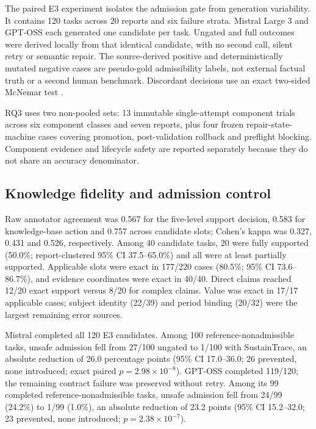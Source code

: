\documentclass[a4paper,fleqn]{cas-sc}
\begin{document}
The paired E3 experiment isolates the admission gate from generation variability. It contains 120
tasks across 20 reports and six failure strata. Mistral Large 3 and GPT-OSS each generated one
candidate per task. Ungated and full outcomes were derived locally from that identical candidate,
with no second call, silent retry or semantic repair. The source-derived positive and
deterministically mutated negative cases are pseudo-gold admissibility labels, not external factual
truth or a second human benchmark. Discordant decisions use an exact two-sided McNemar test
\citep{mcnemar1947sampling}.

RQ3 uses two non-pooled sets: 13 immutable single-attempt component trials across six component
classes and seven reports, plus four frozen repair-state-machine cases covering promotion,
post-validation rollback and preflight blocking. Component evidence and lifecycle safety are
reported separately because they do not share an accuracy denominator.

\subsection{Knowledge fidelity and admission control}

Raw annotator agreement was 0.567 for the five-level support decision, 0.583 for knowledge-base
action and 0.757 across candidate slots; Cohen's kappa was 0.327, 0.431 and 0.526, respectively.
Among 40 candidate tasks, 20 were fully supported (50.0\%; report-clustered 95\% CI 37.5--65.0\%)
and all were at least partially supported. Applicable slots were exact in 177/220 cases (80.5\%;
95\% CI 73.6--86.7\%), and evidence coordinates were exact in 40/40. Direct claims reached 12/20
exact support versus 8/20 for complex claims. Value was exact in 17/17 applicable cases; subject
identity (22/39) and period binding (20/32) were the largest remaining error sources.

Mistral completed all 120 E3 candidates. Among 100 reference-nonadmissible tasks, unsafe admission
fell from 27/100 ungated to 1/100 with SustainTrace, an absolute reduction of 26.0 percentage points
(95\% CI 17.0--36.0; 26 prevented, none introduced; exact paired $p=2.98\times10^{-8}$). GPT-OSS
completed 119/120; the remaining contract failure was preserved without retry. Among its 99
completed reference-nonadmissible tasks, unsafe admission fell from 24/99 (24.2\%) to 1/99 (1.0\%),
an absolute reduction of 23.2 points (95\% CI 15.2--32.0; 23 prevented, none introduced;
$p=2.38\times10^{-7}$).
\end{document}
